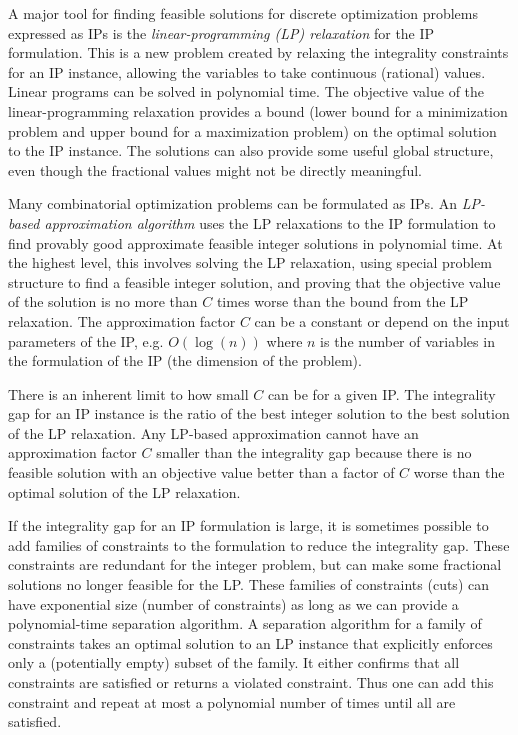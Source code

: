 \iffalse
However, there is substantial research into finding a feasible, provably-good approximate, and even (computationally) provably optimal solutions to specific IP instances. 
There is substantial research into finding a feasible, provably-good approximate solution for TODO, and even (computationally) provably optimal solutions to specific IP instances. \cindy{TODO: probably need to informally distinguish between a IP for a general problem, and a specific instance when the parameters are set.}
\fi

A major tool for finding feasible solutions for discrete optimization problems expressed as IPs is the {\em linear-programming (LP) relaxation} for the IP formulation. This is a new problem created by relaxing the integrality constraints for an IP instance, allowing the variables to take continuous (rational) values. Linear programs can be solved in polynomial time. The objective value of the linear-programming relaxation provides a bound (lower bound for a minimization problem and upper bound for a maximization problem) on the optimal solution to the IP instance. The solutions can also provide some useful global structure, even though the fractional values might not be directly meaningful. 

Many combinatorial optimization problems can be formulated as IPs. An {\em LP-based approximation algorithm} uses the LP relaxations to the IP formulation to find provably good approximate feasible integer solutions in polynomial time. At the highest level, this involves solving the LP relaxation, using special  problem structure to find a feasible integer solution, and proving that the objective value of the solution is no more than $C$ times worse than the bound from the LP relaxation. The approximation factor $C$ can be a constant or depend on the input parameters of the IP, e.g. $O(\log(n))$ where $n$ is the number of variables in the formulation of the IP (the dimension of the problem).

There is an inherent limit to how small $C$ can be for a given IP. The integrality gap for an IP instance is the ratio of the best integer solution to the best solution of the LP relaxation. Any LP-based approximation cannot have an approximation factor $C$ smaller than the integrality gap because there is no feasible solution with an objective value better than a factor of $C$ worse than the optimal solution of the LP relaxation. 

If the integrality gap for an IP formulation is large, it is sometimes possible to add families of constraints to the formulation to reduce the integrality gap.  These constraints are redundant for the integer problem, but can make some fractional solutions no longer feasible for the LP. These families of constraints (cuts) can have exponential size (number of constraints) as long as we can provide a polynomial-time separation algorithm. A separation algorithm for a family of constraints takes an optimal solution to an LP instance that explicitly enforces only a (potentially empty) subset of the family. It either confirms that all constraints are satisfied or returns a violated constraint. Thus one can add this constraint and repeat at most a polynomial number of times until all are satisfied.

